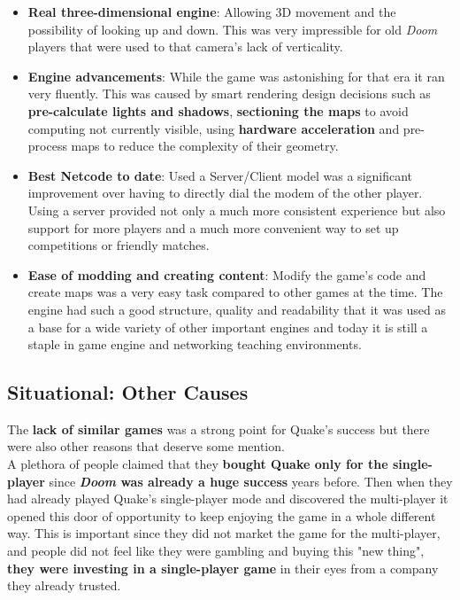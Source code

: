 \begin{itemize}
	\item \textbf{Real three-dimensional engine}: Allowing 3D movement and the possibility of looking up and down. This was very impressible for old \textit{Doom} players that were used to that camera's lack of verticality.
	\item \textbf{Engine advancements}: While the game was astonishing for that era it ran very fluently. This was caused by smart rendering design decisions such as \textbf{pre-calculate lights and shadows}, \textbf{sectioning the maps} to avoid computing not currently visible, using \textbf{hardware acceleration} and pre-process maps to reduce the complexity of their geometry.
	\item \textbf{Best Netcode to date}: Used a Server/Client model was a significant improvement over having to directly dial the modem of the other player. Using a server provided not only a much more consistent experience but also support for more players and a much more convenient way to set up competitions or friendly matches.
	\item \textbf{Ease of modding and creating content}: Modify the game's code and create maps was a very easy task compared to other games at the time. The engine had such a good structure, quality and readability that it was used as a base for a wide variety of other important engines and today it is still a staple in game engine and networking teaching environments.
\end{itemize}

\subsection{Situational: Other Causes}

The \textbf{lack of similar games} was a strong point for Quake's success but there were also other reasons that deserve some mention.\\

A plethora of people claimed that they \textbf{bought Quake only for the single-player} since \textbf{\textit{Doom} was already a huge success} years before. Then when they had already played Quake's single-player mode and discovered the multi-player it opened this door of opportunity to keep enjoying the game in a whole different way. This is important since they did not market the game for the multi-player, and people did not feel like they were gambling and buying this "new thing", \textbf{they were investing in a single-player game} in their eyes from a company they already trusted.\\


